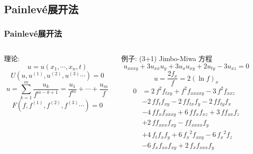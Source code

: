 \documentclass{beamer}
\newcommand{\sbrace}[1]{\left(#1\right)}
\newcommand{\up}[1]{^{(#1)}}
\newcommand{\Painleve}{Painlev{\'e}}
\begin{document}
\subsection{\Painleve{}展开法}
\begin{frame}
\frametitle{\Painleve{}展开法}
\begin{columns}
\small 
\begin{column}{0.5\textwidth}
理论:
\[
    u=u(x_1,\cdots,x_n,t)
\]
\[
    U(u,u\up{1},u\up{2},u\up{3}\cdots)=0
\]
\[
    u=\sum_{k=1}^m{\frac{u_k}{f^{m-k+1}}}=\frac{u_1}{f^m}+\cdots+\frac{u_m}{f}
\]
\[
    F(f,f\up{1},f\up{2},f\up{3}\cdots)=0
\]
\end{column}
\begin{column}{0.5\textwidth}
例子: (3+1) Jimbo-Miwa 方程
\[
    u_{xxxy}+3u_{xx}u_y+3u_{x}u_{xy}+2u_{ty}-3u_{xz}=0
\]
\[
    u=\frac{2f_x}{f}=2\sbrace{\ln f}_x
\]
\[
\begin{split}
    0&=2\,{f}^{2}f_{{{ txy}}}+{f}^{2}f_{{{ xxxxy}}}-3\,{f}^{2}f_{{{ xxz}}}\\
    &-2\,ff_{{t}}f_{{{ xy}}}-2\,ff_{{{ tx}}}f_{{y}}-2\,ff_{{{ ty}}}f_{{x}}\\
    &-4\,ff_{{x}}f_{{{ xxxy}}}+6\,ff_{{x}}f_{{{ xz}}}+3\,ff_{{{ xx}}}f_{{z}}\\
    &+2\,ff_{{{ xxx}}}f_{{{xy}}}-ff_{{{ xxxx}}}f_{{y}}\\
    &+4\,f_{{t}}f_{{x}}f_{{y}}+6\,{f_{{x}}}^{2}f_{{{ xxy}}}-6\,{f_{{x}}}^{2}f_{{z}}\\
    &-6\,f_{{x}}f_{{{ xx}}}f_{{{ xy}}}+2\,f_{{x}}f_{{{ xxx}}}f_{{y}}
\end{split}
\]
\end{column}
\end{columns}
\end{frame}
\end{document}
